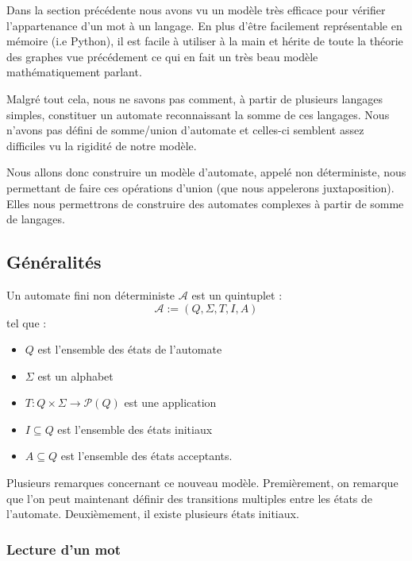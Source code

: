Dans la section précédente nous avons vu un modèle très efficace pour vérifier l'appartenance d'un mot à un langage. 
En plus d'être facilement représentable en mémoire (i.e Python), il est facile à utiliser à la main et 
hérite de toute la théorie des graphes vue précédement ce qui en fait un très beau modèle mathématiquement parlant. 

Malgré tout cela, nous ne savons pas comment, à partir de plusieurs langages simples, constituer un automate 
reconnaissant la somme de ces langages. Nous n'avons pas défini de somme/union d'automate et celles-ci semblent 
assez difficiles vu la rigidité de notre modèle. 

Nous allons donc construire un modèle d'automate, appelé non déterministe, nous permettant de faire ces opérations 
d'union (que nous appelerons juxtaposition). Elles nous permettrons de construire des automates complexes à partir de 
somme de langages. 


\subsection{Généralités}

\begin{definition}[AFN]
    Un automate fini non déterministe $ \mathcal{A}$ est un quintuplet : 
        \[ \mathcal{A} := (Q,\Sigma, T,I,A) \] 
    tel que :
    \begin{itemize}
        \item $Q$ est l'ensemble des états de l'automate 
        \item $\Sigma$ est un alphabet 
        \item $T : Q \times \Sigma \longrightarrow \mathcal{P}(Q)$ est une application 
        \item $I \subseteq Q$ est l'ensemble des états initiaux 
        \item $A \subseteq Q$ est l'ensemble des états acceptants. 
    \end{itemize}
\end{definition}

\begin{remark}
    Plusieurs remarques concernant ce nouveau modèle. Premièrement, on remarque que l'on peut maintenant définir 
    des transitions multiples entre les états de l'automate. Deuxièmement, il existe plusieurs états initiaux. 
\end{remark}

\subsubsection{Lecture d'un mot}

